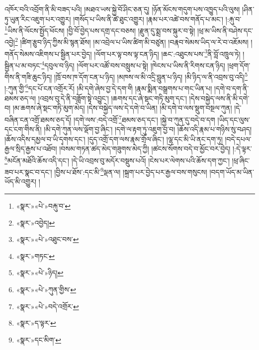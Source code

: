 \documentclass[12pt,a4paper]{book}
\begin{document}
འཁོར་བའི་འབྲོག་ནི་མི་བཟད་པའི། །མཐའ་ཡས་སྐྱེ་བོ་ཤིང་ཅན་དུ། །ཉོན་མོངས་གདུག་པས་འཁྱུད་པའི་ལུས། །ཤིན་ཏུ་ཡུན་རིང་འཇུག་པར་འགྱུར། །གསོད་པ་ཡིས་ནི་ཚེ་ཐུང་འགྱུར། །རྣམ་པར་འཚེ་བས་གནོད་པ་མང་། །:རྐུ་བ་\footnote{«སྣར་»«པེ་»བརྐུ་བ་}ཡིས་ནི་ལོངས་སྤྱོད་ཕོངས། །བྱི་བོ་བྱེད་པས་དགྲ་དང་བཅས། །རྫུན་དུ་སྨྲ་བས་སྐུར་བ་སྟེ། །ཕྲ་མ་ཡིས་ནི་བཤེས་དང་འབྱེ།\footnote{«སྣར་»འབྱེད།} །ཚིག་རྩུབ་ཉིད་ཀྱིས་མི་སྙན་ཐོས། །མ་འབྲེལ་པ་ཡིས་ཚིག་མི་བཙུན། །བརྣབ་སེམས་ཡིད་ལ་རེ་བ་འཇོམས། །གནོད་སེམས་འཇིགས་པ་སྦྱིན་པར་བྱེད། །ལོག་པར་ལྟ་བས་ལྟ་ངན་ཉིད། །ཆང་:འཐུངས་པས་\footnote{«སྣར་»«པེ་»འཐུང་བས་}ནི་བློ་འཁྲུལ་ཏེ། །སྦྱིན་པ་མ་བཏང་\footnote{«སྣར་»གཏང་}དབུལ་བ་ཉིད། །ལོག་པར་འཚོ་བས་བསླུས་པ་སྟེ། །ཁེངས་པ་ཡིས་ནི་རིགས་ངན་ཉིད། །ཕྲག་དོག་གིས་ནི་གཟི་ཆུང་ཉིད། །ཁྲོ་བས་ཁ་དོག་ངན་པ་ཉིད། །མཁས་ལ་མི་འདྲི་བླུན་པ་ཉིད། །མི་ཉིད་ལ་ནི་འབྲས་བུ་འདི།\footnote{«སྣར་»«པེ་»ཉིད།} །:ཀུན་གྱི་\footnote{«སྣར་»«པེ་»ཀུན་གྱིས་}དང་པོ་ངན་འགྲོར་རོ། །མི་དགེ་ཞེས་བྱ་དེ་དག་གི །རྣམ་སྨིན་བསྒྲགས་པ་གང་ཡིན་པ། །དགེ་བ་དག་ནི་ཐམས་ཅད་ལ། །འབྲས་བུ་དེ་ནི་བཟློག་སྟེ་འབྱུང་། །ཆགས་དང་ཞེ་སྡང་གཏི་མུག་དང་། །དེས་བསྐྱེད་ལས་ནི་མི་དགེ་བ། །མ་ཆགས་ཞེ་སྡང་གཏི་མུག་མེད། །དེས་བསྐྱེད་ལས་དེ་དགེ་བ་ཡིན། །མི་དགེ་བ་ལས་སྡུག་བསྔལ་ཀུན། །དེ་བཞིན་ངན་འགྲོ་ཐམས་ཅད་དོ། །དགེ་ལས་:བདེ་འགྲོ་\footnote{«སྣར་»«པེ་»བདེ་འགྲོར་}ཐམས་ཅད་དང་། །སྐྱེ་བ་ཀུན་དུ་བདེ་བ་དག །ཡིད་དང་ལུས་དང་ངག་གིས་ནི། །མི་དགེ་ཀུན་ལས་ལྡོག་བྱ་ཞིང་། །དགེ་ལ་རྟག་ཏུ་འཇུག་བྱ་བ། །ཆོས་འདི་རྣམ་པ་གཉིས་སུ་བཤད། །ཆོས་འདིས་དམྱལ་བ་ཡི་དྭགས་དང་། །དུད་འགྲོ་དག་ལས་རྣམ་གྲོལ་ཞིང་། །ལྷ་དང་མི་ཡི་ནང་དག་ཏུ། །བདེ་དཔལ་རྒྱལ་སྲིད་རྒྱས་པ་འཐོབ། །བསམ་གཏན་ཚད་མེད་གཟུགས་མེད་ཀྱི། །ཚངས་སོགས་བདེ་བ་མྱོང་བར་བྱེད། །:དེ་ལྟར་\footnote{«སྣར་»ད་ལྟར་}མངོན་མཐོའི་ཆོས་འདི་དང་། །དེ་ཡི་འབྲས་བུ་མདོར་བསྡུས་པའོ། །ངེས་པར་ལེགས་པའི་ཆོས་དག་ཀྱང་། །ཕྲ་ཞིང་ཟབ་པར་སྣང་བ་དང་། །བྱིས་པ་ཐོས་:དང་མི་\footnote{«སྣར་»དང་མིག་}ལྡན་ལ། །སྐྲག་པར་བྱེད་པར་རྒྱལ་བས་གསུངས། །བདག་ཡོད་མ་ཡིན་ཡོད་མི་འགྱུར། །
\end{document}
